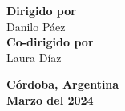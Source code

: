 \begin{center}
\begin{mdframed}[style=US_style]
\vspace*{0.1in}

\textbf{Dirigido por}\\
{\large Danilo Páez}\\
\vspace*{0.2in}
\textbf{Co-dirigido por}\\
{\large Laura Díaz}\\

\vspace*{0.1in}
\end{mdframed}


\vspace*{.2in}
\textbf{Córdoba, Argentina}\\
\textbf{Marzo del 2024}
\vspace*{0.2in}
\end{center}


\thispagestyle{empty} %
\clearpage\setcounter{page}{1} %
